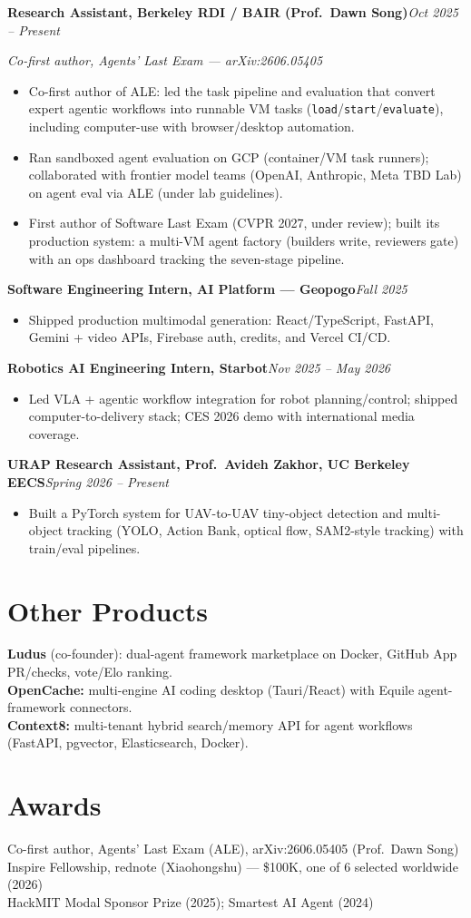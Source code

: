\documentclass[10pt, letterpaper]{article}
\newcommand{\role}[2]{%
  \vspace{5pt}%
  \noindent\textbf{#1}\hfill\textit{#2}\par
}
\newcommand{\rolesub}[1]{%
  \noindent\textit{#1}\par\vspace{1pt}%
}
\begin{document}
\role{Research Assistant, Berkeley RDI / BAIR (Prof.\ Dawn Song)}{Oct 2025 -- Present}
\rolesub{Co-first author, Agents' Last Exam --- arXiv:2606.05405}
\begin{itemize}
  \item Co-first author of ALE: led the task pipeline and evaluation that convert expert agentic workflows into runnable VM tasks (\texttt{load}/\texttt{start}/\texttt{evaluate}), including computer-use with browser/desktop automation.
  \item Ran sandboxed agent evaluation on GCP (container/VM task runners); collaborated with frontier model teams (OpenAI, Anthropic, Meta TBD Lab) on agent eval via ALE (under lab guidelines).
  \item First author of Software Last Exam (CVPR 2027, under review); built its production system: a multi-VM agent factory (builders write, reviewers gate) with an ops dashboard tracking the seven-stage pipeline.
\end{itemize}

\role{Software Engineering Intern, AI Platform --- Geopogo}{Fall 2025}
\begin{itemize}
  \item Shipped production multimodal generation: React/TypeScript, FastAPI, Gemini + video APIs, Firebase auth, credits, and Vercel CI/CD.
\end{itemize}

\role{Robotics AI Engineering Intern, Starbot}{Nov 2025 -- May 2026}
\begin{itemize}
  \item Led VLA + agentic workflow integration for robot planning/control; shipped computer-to-delivery stack; CES 2026 demo with international media coverage.
\end{itemize}

\role{URAP Research Assistant, Prof.\ Avideh Zakhor, UC Berkeley EECS}{Spring 2026 -- Present}
\begin{itemize}
  \item Built a PyTorch system for UAV-to-UAV tiny-object detection and multi-object tracking (YOLO, Action Bank, optical flow, SAM2-style tracking) with train/eval pipelines.
\end{itemize}

\section{Other Products}
\textbf{Ludus} (co-founder): dual-agent framework marketplace on Docker, GitHub App PR/checks, vote/Elo ranking.\\[2pt]
\textbf{OpenCache:} multi-engine AI coding desktop (Tauri/React) with Equile agent-framework connectors.\\[2pt]
\textbf{Context8:} multi-tenant hybrid search/memory API for agent workflows (FastAPI, pgvector, Elasticsearch, Docker).

\section{Awards}
Co-first author, Agents' Last Exam (ALE), arXiv:2606.05405 (Prof.\ Dawn Song)\\[1pt]
Inspire Fellowship, rednote (Xiaohongshu) --- \$100K, one of 6 selected worldwide (2026)\\[1pt]
HackMIT Modal Sponsor Prize (2025); Smartest AI Agent (2024)
\end{document}
